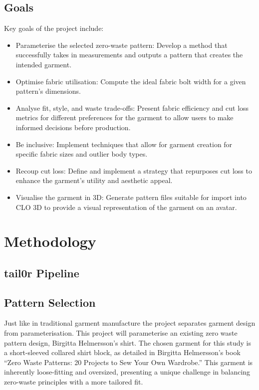 \subsection{Goals}
Key goals of the project include:
\begin{itemize}
    \item Parameterise the selected zero-waste pattern: Develop a method that successfully takes in measurements and outputs a pattern that creates the intended garment.
    \item Optimise fabric utilisation: Compute the ideal fabric bolt width for a given pattern's dimensions.
    \item Analyse fit, style, and waste trade-offs: Present fabric efficiency and cut loss metrics for different preferences for the garment to allow users to make informed decisions before production.
    \item Be inclusive: Implement techniques that allow for garment creation for specific fabric sizes and outlier body types.
    \item Recoup cut loss: Define and implement a strategy that repurposes cut loss to enhance the garment's utility and aesthetic appeal.
    \item Visualise the garment in 3D: Generate pattern files suitable for import into CLO 3D to provide a visual representation of the garment on an avatar.
\end{itemize}

\section{Methodology}

\subsection{tail0r Pipeline}

\subsection{Pattern Selection}
Just like in traditional garment manufacture the project separates garment design from parameterisation. This project will parameterise an existing zero waste pattern design, Birgitta Helmersson’s shirt.
The chosen garment for this study is a short-sleeved collared shirt block, as detailed in Birgitta Helmersson’s book “Zero Waste Patterns: 20 Projects to Sew Your Own Wardrobe.” This garment is inherently loose-fitting and oversized, presenting a unique challenge in balancing zero-waste principles with a more tailored fit.

